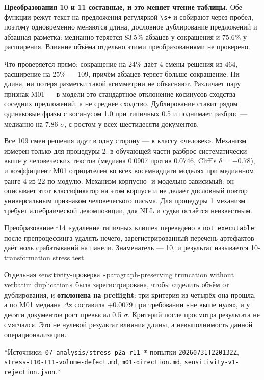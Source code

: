\documentclass[11pt,a4paper]{article}
\renewcommand{\_}{\textunderscore\allowbreak}
\begin{document}
\textbf{Преобразования 10 и 11 составные, и это меняет чтение таблицы.} Обе функции
режут текст на предложения регуляркой \texttt{\textbackslash{}s+} и собирают через пробел, поэтому
одновременно меняются длина, дословное дублирование предложений и абзацная
разметка: медианно теряется 83.5\% абзацев у сокращения и 75.6\% у расширения.
Влияние объёма отдельно этими преобразованиями не проверено.

Что проверяется прямо: сокращение на 24\% даёт 4 смены решения из 464, расширение
на 25\% — 109, причём абзацев теряет больше сокращение. Ни длина, ни потеря
разметки такой асимметрии не объясняют. Различает пару признак M01 — в модели это
стандартное отклонение косинусов сходства соседних предложений, а не среднее
сходство. Дублирование ставит рядом одинаковые фразы с косинусом 1.0 при типичных
0.5 и поднимает разброс — медианно на 7.86 $\sigma$, с ростом у всех шестидесяти
документов.

Все 109 смен решения идут в одну сторону — к классу «человек». Механизм измерен
только для процедуры 2: в обучающей части разброс систематически выше у
человеческих текстов (медиана 0.0907 против 0.0746, Cliff's $\delta$ = $-$0.78), и
коэффициент M01 отрицателен во всех восемнадцати моделях при медианном ранге 4 из
22 по модулю. Механизм корпусно- и модельно-зависимый: он описывает этот
классификатор на этом корпусе и не делает дословный повтор универсальным
признаком человеческого письма. Для процедуры 1 механизм требует алгебраической
декомпозиции, для NLL и судьи остаётся неизвестным.

Преобразование t14 «удаление типичных клише» переведено в \texttt{not executable}:
после препроцессинга удалять нечего, зарегистрированный перечень артефактов даёт
ноль срабатываний на панели. Знаменатель — 10, и результат называется
10-transformation stress test.

Отдельная sensitivity-проверка «paragraph-preserving truncation without verbatim
duplication» была зарегистрирована, чтобы отделить объём от дублирования, и
\textbf{отклонена на preflight}: три критерия из четырёх она прошла, а по M01 медиана
$\Delta$z составила +0.0079 при требовании «не выше нуля», и у десяти документов рост
превысил 0.5 $\sigma$. Критерий после просмотра результата не смягчался. Это не нулевой
результат влияния длины, а невыполнимость данной операционализации.

*Источники: \texttt{07-\allowbreak{}analysis/stress-\allowbreak{}p2a-\allowbreak{}r11-\allowbreak{}*} попытки \texttt{20260731T220132Z},
\texttt{stress-\allowbreak{}t10-\allowbreak{}t11-\allowbreak{}volume-\allowbreak{}defect.md}, \texttt{m01-\allowbreak{}direction.md},
\texttt{sensitivity-\allowbreak{}v1-\allowbreak{}rejection.json}.*
\end{document}
